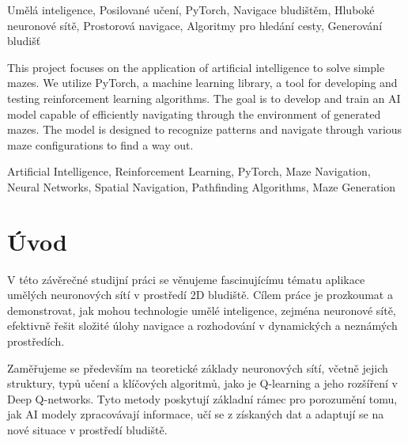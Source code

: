 \documentclass[12pt, a4paper,
twoside,        %
openright
]{report}
\begin{document}

\noindent Umělá inteligence, Posilované učení, PyTorch, Navigace bludištěm, Hluboké neuronové sítě, Prostorová navigace, Algoritmy pro hledání cesty, Generování bludišť
\vspace{18pt}


\noindent This project focuses on the application of artificial intelligence to solve simple mazes. We utilize PyTorch, a machine learning library, a tool for developing and testing reinforcement learning algorithms. The goal is to develop and train an AI model capable of efficiently navigating through the environment of generated mazes. The model is designed to recognize patterns and navigate through various maze configurations to find a way out.

\vspace{18pt}


\noindent Artificial Intelligence, Reinforcement Learning, PyTorch, Maze Navigation, Neural Networks, Spatial Navigation, Pathfinding Algorithms, Maze Generation 

\clearpage %


\tableofcontents %

\setcounter{page}{1} %

\chapter*{Úvod}
V této závěrečné studijní práci se věnujeme fascinujícímu tématu aplikace umělých neuronových sítí v prostředí 2D bludiště. Cílem práce je prozkoumat a demonstrovat, jak mohou technologie umělé inteligence, zejména neuronové sítě, efektivně řešit složité úlohy navigace a rozhodování v dynamických a neznámých prostředích.

Zaměřujeme se především na teoretické základy neuronových sítí, včetně jejich struktury, typů učení a klíčových algoritmů, jako je Q-learning a jeho rozšíření v Deep Q-networks. Tyto metody poskytují základní rámec pro porozumění tomu, jak AI modely zpracovávají informace, učí se z získaných dat a adaptují se na nové situace v prostředí bludiště.
\end{document}
